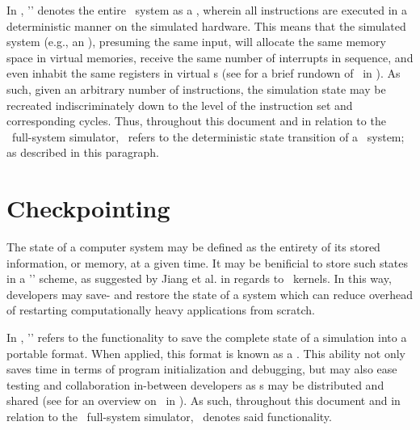In \dvttermsimics , '\dvttermdeterministicexecution ' denotes the entire \dvttermtarget\ system as a \dvttermdeterministicalgorithm , wherein all instructions are executed in a deterministic manner on the simulated hardware.
This means that the simulated system (e.g., an \dvttermos ), presuming the same input, will allocate the same memory space in virtual memories, receive the same number of interrupts in sequence, and even inhabit the same registers in virtual \dvttermcpu s (see  for a brief rundown of \dvttermdeterministicexecution\ in \dvttermsimics ).
As such, given an arbitrary number of instructions, the simulation state may be recreated indiscriminately down to the level of the instruction set and corresponding cycles.
Thus, throughout this document and in relation to the \dvttermsimics\ full-system simulator, \dvttermdeterministicexecution\ refers to the deterministic state transition of a \dvttermtarget\ system; as described in this paragraph.

\section{Checkpointing}
\label{sec:background_checkpointing}

The state of a computer system may be defined as the entirety of its stored information, or memory, at a given time.
It may be benificial to store such states in a '\dvttermcheckpointrestart ' scheme, as suggested by Jiang et al. in regards to \dvttermcuda\ kernels.
In this way, developers may save- and restore the state of a system which can reduce overhead of restarting computationally heavy applications from scratch.

In \dvttermsimics , '\dvttermcheckpointing ' refers to the functionality to save the complete state of a simulation into a portable format.
When applied, this format is known as a \dvttermcheckpoint .
This ability not only  saves time in terms of program initialization and debugging, but may also ease testing and collaboration in-between developers as \dvttermcheckpoint s may be distributed and shared (see  for an overview on \dvttermcheckpointing\ in \dvttermsimics ).
As such, throughout this document and in relation to the \dvttermsimics\ full-system simulator, \dvttermcheckpointing\ denotes said functionality.

